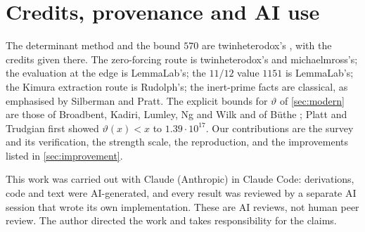 \documentclass[11pt]{article}
\theoremstyle{definition}
\begin{document}
\section{Credits, provenance and AI use}\label{sec:credits}
The determinant method and the bound $570$ are twinheterodox's \cite{twinheterodox}, with the credits given there. The zero-forcing route is twinheterodox's and michaelmross's; the evaluation at the edge is LemmaLab's; the $11/12$ value $1151$ is LemmaLab's; the Kimura extraction route is Rudolph's; the inert-prime facts are classical, as emphasised by Silberman and Pratt. The explicit bounds for $\vartheta$ of \cref{sec:modern} are those of Broadbent, Kadiri, Lumley, Ng and Wilk \cite{BKLNW} and of B\"uthe \cite{Buthe2018}; Platt and Trudgian \cite{PlattTrudgian2016} first showed $\vartheta(x) < x$ to $1.39\cdot10^{17}$. Our contributions are the survey and its verification, the strength scale, the reproduction, and the improvements listed in \cref{sec:improvement}.

This work was carried out with Claude (Anthropic) in Claude Code: derivations, code and text were AI-generated, and every result was reviewed by a separate AI session that wrote its own implementation. These are AI reviews, not human peer review. The author directed the work and takes responsibility for the claims.



\end{document}
